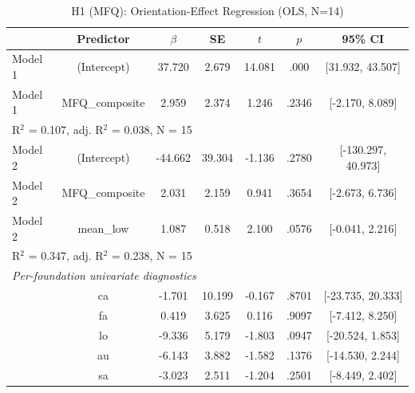 \begin{table}[ht]
\centering
\caption{H1 (MFQ): Orientation-Effect Regression (OLS, N=14)}
\label{tab:h1-regression-mfq}
\begin{tabular}{lcccccc}
\toprule
& Predictor & $\beta$ & SE & $t$ & $p$ & 95\% CI \\
\midrule
Model 1 & (Intercept) & 37.720 & 2.679 & 14.081 & .000 & [31.932, 43.507] \\
Model 1 & MFQ_composite & 2.959 & 2.374 & 1.246 & .2346 & [-2.170, 8.089] \\
\multicolumn{7}{l}{R$^2$ = 0.107, adj. R$^2$ = 0.038, N = 15} \\
\addlinespace
Model 2 & (Intercept) & -44.662 & 39.304 & -1.136 & .2780 & [-130.297, 40.973] \\
Model 2 & MFQ_composite & 2.031 & 2.159 & 0.941 & .3654 & [-2.673, 6.736] \\
Model 2 & mean_low & 1.087 & 0.518 & 2.100 & .0576 & [-0.041, 2.216] \\
\multicolumn{7}{l}{R$^2$ = 0.347, adj. R$^2$ = 0.238, N = 15} \\
\midrule
\multicolumn{7}{l}{\textit{Per-foundation univariate diagnostics}} \\
& ca & -1.701 & 10.199 & -0.167 & .8701 & [-23.735, 20.333] \\
& fa & 0.419 & 3.625 & 0.116 & .9097 & [-7.412, 8.250] \\
& lo & -9.336 & 5.179 & -1.803 & .0947 & [-20.524, 1.853] \\
& au & -6.143 & 3.882 & -1.582 & .1376 & [-14.530, 2.244] \\
& sa & -3.023 & 2.511 & -1.204 & .2501 & [-8.449, 2.402] \\
\bottomrule
\end{tabular}
\end{table}
